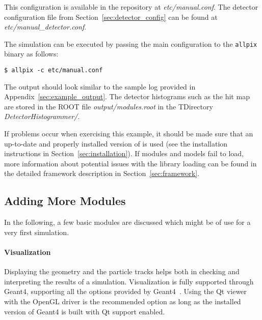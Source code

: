 This configuration is available in the repository at \textit{etc/manual.conf}.
The detector configuration file from Section~\ref{sec:detector_config} can be found at \textit{etc/manual\_detector.conf}.

The simulation can be executed by passing the main configuration to the \texttt{allpix} binary as follows:
\begin{verbatim}
$ allpix -c etc/manual.conf
\end{verbatim}
The output should look similar to the sample log provided in Appendix~\ref{sec:example_output}.
The detector histograms such as the hit map are stored in the ROOT file \textit{output/modules.root} in the TDirectory \textit{DetectorHistogrammer/}.

If problems occur when exercising this example, it should be made sure that an up-to-date and properly installed version of \apsq is used (see the installation instructions in Section~\ref{sec:installation}).
If modules and models fail to load, more information about potential issues with the library loading can be found in the detailed framework description in Section~\ref{sec:framework}.

\subsection{Adding More Modules}
In the following, a few basic modules are discussed which might be of use for a very first simulation.

\paragraph{Visualization}
Displaying the geometry and the particle tracks helps both in checking and interpreting the results of a simulation.
Visualization is fully supported through Geant4, supporting all the options provided by Geant4~\cite{geant4vis}.
Using the Qt viewer with the OpenGL driver is the recommended option as long as the installed version of Geant4 is built with Qt support enabled.

